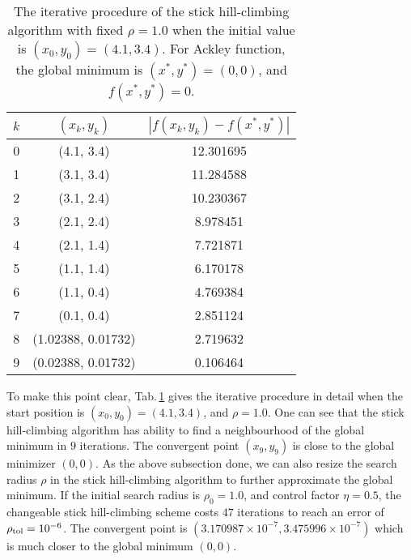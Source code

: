 \documentclass[mathpazo]{aamm}
\begin{document}
\begin{table}[!htbp]
\caption{\label{tab:ackley:CHC}The iterative procedure of the stick
hill-climbing algorithm with fixed $\rho=1.0$ when the initial
value is $(x_0, y_0)=(4.1, 3.4)$. For Ackley function, the global
minimum is $(x^*, y^*)=(0,0)$, and $f(x^*,y^*)=0$.}
\begin{center}
	\footnotesize{
\begin{tabular}{|c|c|c|}
 \hline
 $k$ & $(x_k,y_k)$ & $|f(x_k,y_k)-f(x^*,y^*)|$
 \\ \hline
0 & (4.1, 3.4) & 12.301695
 \\ \hline
1 & (3.1, 3.4) & 11.284588
 \\ \hline
2 & (3.1, 2.4) & 10.230367
 \\ \hline
3 & (2.1, 2.4) &  8.978451
 \\ \hline
4 & (2.1, 1.4) &  7.721871
 \\ \hline
5 & (1.1, 1.4) & 6.170178
 \\ \hline
6 & (1.1, 0.4) & 4.769384
 \\ \hline
7 & (0.1, 0.4) & 2.851124 
 \\ \hline
8 & (1.02388, 0.01732) & 2.719632 
 \\ \hline
9 & (0.02388, 0.01732) & 0.106464
 \\ \hline
\end{tabular}
}
\end{center}
\end{table}
To make this point clear, Tab.\,\ref{tab:ackley:CHC} gives the
iterative procedure in detail when the start position is $(x_0,
y_0)=(4.1,3.4)$, and $\rho=1.0$. 
One can see that the stick hill-climbing algorithm has ability to
find a neighbourhood of the global minimum in $9$ iterations.
The convergent point $(x_9, y_9)$ is close to the global minimizer $(0,0)$. 
As the above subsection done, we can also resize the search radius
$\rho$ in the stick hill-climbing algorithm to further approximate the global minimum.
If the initial search radius is $\rho_0=1.0$, and control factor
$\eta=0.5$, the changeable stick hill-climbing scheme costs $47$ iterations to reach an
error of $\rho_{\rm tol}=10^{-6}$. The convergent point is
$(3.170987\times 10^{-7}, 3.475996\times 10^{-7})$ which is much
closer to the global minimum $(0,0)$.
\end{document}
